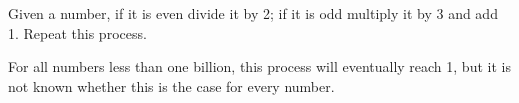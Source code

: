  Given a number, if it is even divide it by 2; if it is odd 
multiply it by 3 and add 1. Repeat this process.
\par
For all numbers less than one billion, this process will
eventually reach 1, but it is not known whether this is the 
case for every number.
